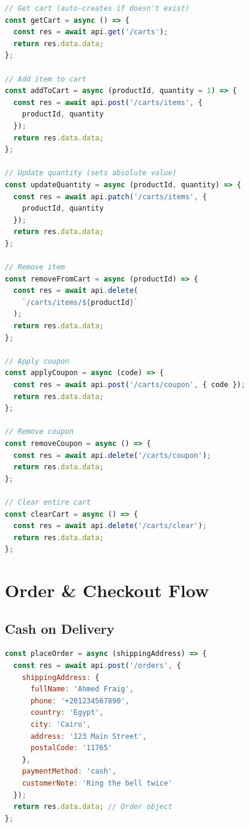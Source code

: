 \begin{lstlisting}[language=JavaScript,title=Cart API Calls]
// Get cart (auto-creates if doesn't exist)
const getCart = async () => {
  const res = await api.get('/carts');
  return res.data.data;
};

// Add item to cart
const addToCart = async (productId, quantity = 1) => {
  const res = await api.post('/carts/items', {
    productId, quantity
  });
  return res.data.data;
};

// Update quantity (sets absolute value)
const updateQuantity = async (productId, quantity) => {
  const res = await api.patch('/carts/items', {
    productId, quantity
  });
  return res.data.data;
};

// Remove item
const removeFromCart = async (productId) => {
  const res = await api.delete(
    `/carts/items/${productId}`
  );
  return res.data.data;
};

// Apply coupon
const applyCoupon = async (code) => {
  const res = await api.post('/carts/coupon', { code });
  return res.data.data;
};

// Remove coupon
const removeCoupon = async () => {
  const res = await api.delete('/carts/coupon');
  return res.data.data;
};

// Clear entire cart
const clearCart = async () => {
  const res = await api.delete('/carts/clear');
  return res.data.data;
};
\end{lstlisting}

\section{Order \& Checkout Flow}

\subsection{Cash on Delivery}

\begin{lstlisting}[language=JavaScript,title=Cash Order Flow]
const placeOrder = async (shippingAddress) => {
  const res = await api.post('/orders', {
    shippingAddress: {
      fullName: 'Ahmed Fraig',
      phone: '+201234567890',
      country: 'Egypt',
      city: 'Cairo',
      address: '123 Main Street',
      postalCode: '11765'
    },
    paymentMethod: 'cash',
    customerNote: 'Ring the bell twice'
  });
  return res.data.data; // Order object
};
\end{lstlisting}

